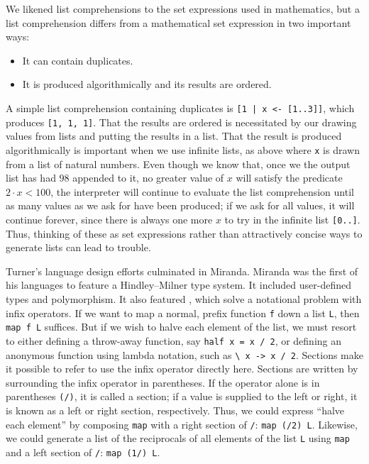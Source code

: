 We likened list comprehensions to the set expressions used in mathematics, but a list comprehension differs from a mathematical set expression in two important ways:
\begin{itemize}
\item
It can contain duplicates.
\item
It is produced algorithmically and its results are ordered.
\end{itemize}
A simple list comprehension containing duplicates is \lstinline{[1 | x <- [1..3]]}, which produces \lstinline{[1, 1, 1]}. That the results are ordered is necessitated by our drawing values from lists and putting the results in a list. That the result is produced algorithmically is important when we use infinite lists, as above where \lstinline{x} is drawn from a list of natural numbers. Even though we know that, once we the output list has had $98$ appended to it, no greater value of $x$ will satisfy the predicate $2\cdot x < 100$, the interpreter will continue to evaluate the list comprehension until as many values as we ask for have been produced; if we ask for all values, it will continue forever, since there is always one more $x$ to try in the infinite list \lstinline{[0..]}. Thus, thinking of these as set expressions rather than attractively concise ways to generate lists can lead to trouble.

Turner's language design efforts culminated in Miranda. Miranda was the first of his languages to feature a Hindley--Milner type system. It included user-defined types and polymorphism. It also featured , which solve a notational problem with infix operators. If we want to map a normal, prefix function \lstinline{f} down a list \lstinline{L}, then \lstinline{map f L} suffices. But if we wish to halve each element of the list, we must resort to either defining a throw-away function, say \lstinline{half x = x / 2}, or defining an anonymous function using lambda notation, such as \lstinline{\ x -> x / 2}. Sections make it possible to refer to use the infix operator directly here. Sections are written by surrounding the infix operator in parentheses. If the operator alone is in parentheses \lstinline{(/)}, it is called a section; if a value is supplied to the left or right, it is known as a left or right section, respectively. Thus, we could express ``halve each element'' by composing \lstinline{map} with a right section of \lstinline{/}: \lstinline{map (/2) L}. Likewise, we could generate a list of the reciprocals of all elements of the list \lstinline{L} using \lstinline{map} and a left section of \lstinline{/}: \lstinline{map (1/) L}.

